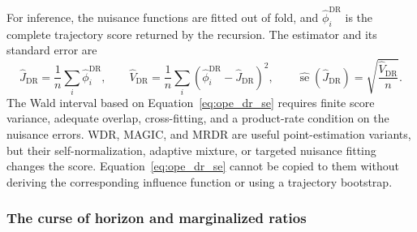 For inference, the nuisance functions are fitted out of fold, and $\hat\phi_i^{\mathrm{DR}}$ is the complete trajectory score returned by the recursion. The estimator and its standard error are
\begin{equation}
\hat J_{\mathrm{DR}}=\frac1n\sum_i\hat\phi_i^{\mathrm{DR}},
\qquad
\hat V_{\mathrm{DR}}
=\frac1n\sum_i
\left(\hat\phi_i^{\mathrm{DR}}-\hat J_{\mathrm{DR}}\right)^2,
\qquad
\widehat{\operatorname{se}}(\hat J_{\mathrm{DR}})
=\sqrt{\frac{\hat V_{\mathrm{DR}}}{n}}.
\label{eq:ope_dr_se}
\end{equation}
The Wald interval based on Equation~\eqref{eq:ope_dr_se} requires finite score variance, adequate overlap, cross-fitting, and a product-rate condition on the nuisance errors. WDR, MAGIC, and MRDR are useful point-estimation variants, but their self-normalization, adaptive mixture, or targeted nuisance fitting changes the score. Equation~\eqref{eq:ope_dr_se} cannot be copied to them without deriving the corresponding influence function or using a trajectory bootstrap.

\subsubsection*{The curse of horizon and marginalized ratios}

